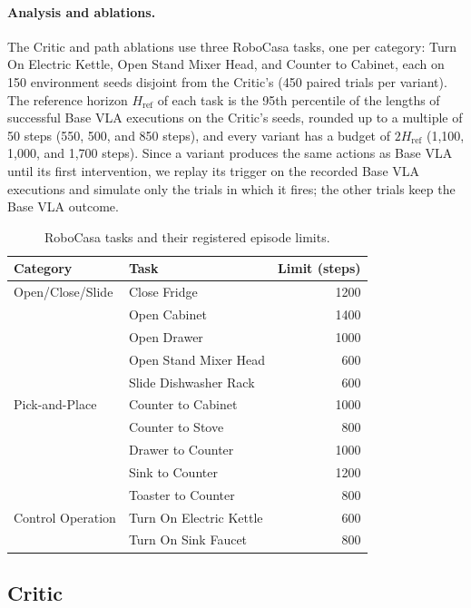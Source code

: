 \paragraph{Analysis and ablations.}
The Critic and path ablations use three RoboCasa tasks, one per category: Turn On Electric Kettle, Open Stand Mixer Head, and Counter to Cabinet, each on 150 environment seeds disjoint from the Critic's (450 paired trials per variant). The reference horizon $H_{\mathrm{ref}}$ of each task is the 95th percentile of the lengths of successful Base VLA executions on the Critic's seeds, rounded up to a multiple of 50 steps (550, 500, and 850 steps), and every variant has a budget of $2H_{\mathrm{ref}}$ (1,100, 1,000, and 1,700 steps). Since a variant produces the same actions as Base VLA until its first intervention, we replay its trigger on the recorded Base VLA executions and simulate only the trials in which it fires; the other trials keep the Base VLA outcome.

\begin{table}[!t]
\centering
\small
\caption{RoboCasa tasks and their registered episode limits.}
\label{tab:app-robocasa}
\begin{tabular}{@{}llr@{}}
\toprule
Category & Task & Limit (steps) \\
\midrule
Open/Close/Slide & Close Fridge & 1200 \\
 & Open Cabinet & 1400 \\
 & Open Drawer & 1000 \\
 & Open Stand Mixer Head & 600 \\
 & Slide Dishwasher Rack & 600 \\
\midrule
Pick-and-Place & Counter to Cabinet & 1000 \\
 & Counter to Stove & 800 \\
 & Drawer to Counter & 1000 \\
 & Sink to Counter & 1200 \\
 & Toaster to Counter & 800 \\
\midrule
Control Operation & Turn On Electric Kettle & 600 \\
 & Turn On Sink Faucet & 800 \\
\bottomrule
\end{tabular}
\end{table}

\subsection{Critic}
\label{app:critic}

